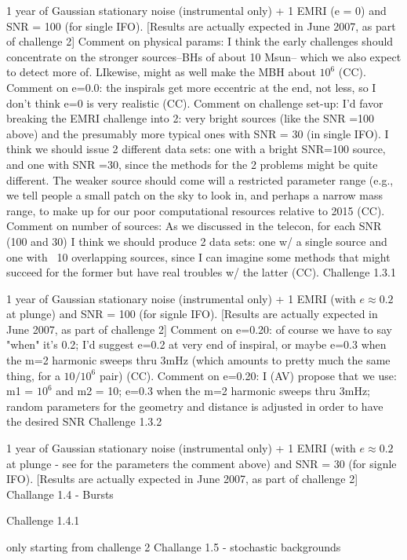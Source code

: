 \documentclass[11pt]{report}
\begin{document}
1 year of Gaussian stationary noise (instrumental only) + 1 EMRI (e = 0) and SNR = 100 (for single IFO). [Results are actually expected in June 2007, as part of challenge 2]
Comment on physical params: I think the early challenges should concentrate on the stronger sources--BHs of about 10 Msun--
which we also expect to detect more of. LIkewise, might as well make the MBH about $10^6$ (CC).
Comment on e=0.0: the inspirals get more eccentric at the end, not less, so I don't think e=0 is very realistic (CC).
Comment on challenge set-up: I'd favor breaking the EMRI challenge into 2: very bright sources (like the SNR =100 above) and 
the presumably more typical ones with SNR = 30 (in single IFO).  I think we should issue 2 different data sets: one with
a bright SNR=100 source, and one with SNR =30, since the methods for the 2 problems might be quite different.  The weaker
source should come will a restricted parameter range (e.g., we tell people a small patch on the sky to look in, and perhaps
a narrow mass range, to make up for our poor computational resources relative to 2015 (CC).
Comment on number of sources: As we discussed in the telecon, for each SNR (100 and 30) I think we should produce 2 data
sets: one w/ a single source and one with ~10 overlapping sources, since I can imagine some methods that might succeed for
the former but have real troubles w/ the latter (CC).
Challenge 1.3.1

1 year of Gaussian stationary noise (instrumental only) + 1 EMRI (with $e \approx 0.2$ at plunge) and SNR = 100 (for signle IFO). [Results are actually expected in June 2007, as part of challenge 2]
Comment on e=0.20: of course we have to say "when" it's 0.2; I'd suggest e=0.2 at very end of inspiral, or maybe
e=0.3  when the m=2 harmonic sweeps thru 3mHz (which amounts to pretty much the same thing, for a $10/10^6$ pair) (CC).
Comment on e=0.20: I (AV) propose that we use: m1 = $10^6$ and m2 = 10; e=0.3  when the m=2 harmonic sweeps thru 3mHz; random parameters for the geometry and distance is adjusted in order to have the desired SNR
Challenge 1.3.2

1 year of Gaussian stationary noise (instrumental only) + 1 EMRI (with $e \approx 0.2$ at plunge - see for the parameters the comment above) and SNR = 30 (for signle IFO). [Results are actually expected in June 2007, as part of challenge 2]
Challange 1.4 - Bursts

Challenge 1.4.1

only starting from challenge 2
Challange 1.5 - stochastic backgrounds
\end{document}

